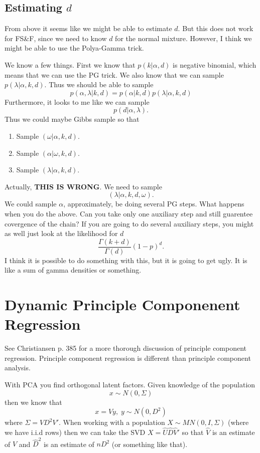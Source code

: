 \documentclass{article}
\begin{document}
\subsection*{Estimating $d$}

From above it seems like we might be able to estimate $d$.  But this does not
work for FS\&F, since we need to know $d$ for the normal mixture.  However, I
think we might be able to use the Polya-Gamma trick. 

We know a few things.  First we know that $p(k | \alpha, d)$ is negative
binomial, which means that we can use the PG trick.  We also know that we can
sample $p(\lambda | \alpha, k, d)$.  Thus we should be able to sample
\[
p(\alpha, \lambda | k, d) =  p(\alpha | k, d) p(\lambda | \alpha, k, d)
\]
Furthermore, it looks to me like we can sample
\[
p(d | \alpha, \lambda).
\]
Thus we could maybe Gibbs sample so that
\begin{enumerate}
\item Sample $(\omega | \alpha, k, d)$.
\item Sample $(\alpha | \omega, k, d)$.
\item Sample $(\lambda | \alpha, k, d)$.
\end{enumerate}
Actually, \textbf{THIS IS WRONG}.  We need to sample
\[
(\lambda | \alpha, k, d, \omega).
\]
We could sample $\alpha$, approximately, be doing several PG steps.  What
happens when you do the above.  Can you take only one auxiliary step and still
guarentee covergence of the chain?  If you are going to do several auxiliary
steps, you might as well just look at the likelihood for $d$
\[
\frac{\Gamma(k+d)}{\Gamma(d)} (1-p)^d.
\]
I think it is possible to do something with this, but it is going to get ugly.
It is like a sum of gamma densities or something.

\section{Dynamic Principle Componenent Regression}

See Christiansen p. 385 for a more thorough discussion of principle component
regression.  Principle component regression is different than principle
component analysis.

With PCA you find orthogonal latent factors.  Given knowledge of the population
\[
x \sim N(0, \Sigma)
\]
then we know that
\[
x = Vy, \; y \sim N(0, D^2)
\]
where $\Sigma = VD^2V'$.  When working with a population $X \sim MN(0, I,
\Sigma)$ (where we have i.i.d rows) then we can take the SVD $X = \hat U \hat D
\hat V'$ so that $\hat V$ is an estimate of $V$ and $\hat D^2$ is an estimate of
$n D^2$ (or something like that).
\end{document}
